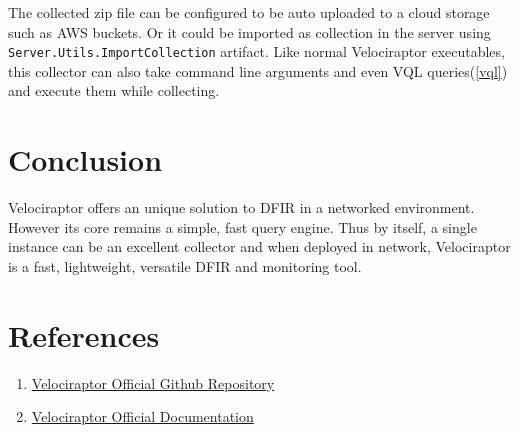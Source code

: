 \documentclass[a4paper, 11pt, oneside]{article} %
\begin{document}
The collected zip file can be configured to be auto uploaded to a cloud storage such as AWS buckets. Or it could be imported as collection in the server using \verb|Server.Utils.ImportCollection| artifact. Like normal Velociraptor executables, this collector can also take command line arguments and even VQL queries(\ref{vql}) and execute them while collecting.

\section{Conclusion}
Velociraptor offers an unique solution to DFIR in a networked environment. However its core remains a simple, fast query engine. Thus by itself, a single instance can be an excellent collector and when deployed in network, Velociraptor is a fast, lightweight, versatile DFIR and monitoring tool. 
\section{References}
\begin{enumerate}
    \item \href{https://Github.com/Velocidex/velociraptor/}{Velociraptor Official Github Repository}
    \item \href{https://docs.velociraptor.app}{Velociraptor Official Documentation}
\end{enumerate}
\end{document}
